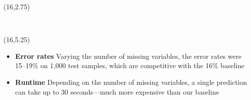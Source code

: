 \documentclass[a0]{a0poster}
\begin{document}
\begin{textblock}{7.0}(16,2.75)

\begin{figure}[!h]
  \centering
  \hbox{
    \hspace{-2em}
  }
  \label{fig3}
\end{figure}

\end{textblock}

\begin{textblock}{7.0}(16,5.25)

\begin{itemize}

  \item \textbf{Error rates} Varying the number of missing variables, the error rates were 15--19\% on 1,000 test samples, which are competitive with the 16\% baseline

  \item \textbf{Runtime} Depending on the number of missing variables, a single prediction can take up to 30 seconds---much more expensive than our baseline

\end{itemize}

\end{textblock}
\end{document}
